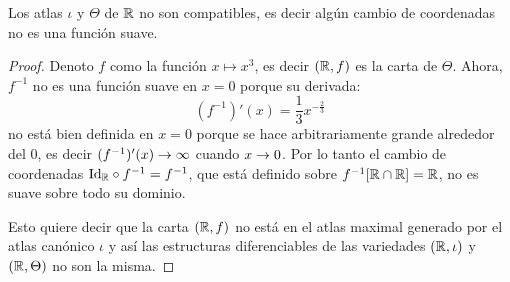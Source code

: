 \begin{ejercicio}\label{ej:19}
  Los atlas $\iota$ y $\Theta$ de $\mathbb{R}$ no son compatibles, es decir alg\'un cambio de coordenadas
  no es una funci\'on suave.
\end{ejercicio}

\begin{proof}%
  Denoto $f$ como la funci\'on $x\mapsto x^3$, es decir $(\mathbb{R},f)$ es la carta de $\Theta$.
  Ahora, $f^{-1}$ no es una funci\'on suave en $x=0$ porque su derivada:
  \[
    (f^{-1})'(x)=\frac{1}{3}x^{-\frac{2}{3}}
  \]
  no est\'a bien definida en $x=0$ porque se hace arbitrariamente grande alrededor del 0, es decir
  $(f^{-1})'(x)\rightarrow\infty$ cuando $x\rightarrow 0$. Por lo tanto el cambio de coordenadas
  $\text{Id}_{\mathbb{R}}\circ f^{-1}=f^{-1}$, que est\'a definido sobre $f^{-1}[\mathbb{R}\cap\mathbb{R}]=\mathbb{R}$, no es suave
  sobre todo su dominio.

  Esto quiere decir que la carta $(\mathbb{R},f)$ no est\'a en el atlas maximal generado por el atlas
  can\'onico $\iota$ y as\'i las estructuras diferenciables de las variedades $(\mathbb{R},\iota)$ y
  $(\mathbb{R},\Theta)$ no son la misma.  
\end{proof}%



